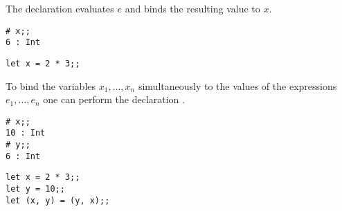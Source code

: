 \documentclass[11pt]{article}
\begin{document}
The declaration 
evaluates $e$ and binds the  resulting value to $x$.

\begin{session}
\emlsession
\begin{verbatim}
# x;;
6 : Int
\end{verbatim}
\emlfile
\begin{verbatim}
let x = 2 * 3;;
\end{verbatim}
\emlend
\end{session}


To bind the variables $x_1,\ldots,x_n$
simultaneously to the
values of the expressions $e_1,\ldots,e_n$ one can perform the declaration
.

\begin{session}
\emlsession
\begin{verbatim}
# x;;
10 : Int
# y;;
6 : Int
\end{verbatim}
\emlfile
\begin{verbatim}
let x = 2 * 3;;
let y = 10;;
let (x, y) = (y, x);;
\end{verbatim}
\emlend
\end{session}

\end{document}
